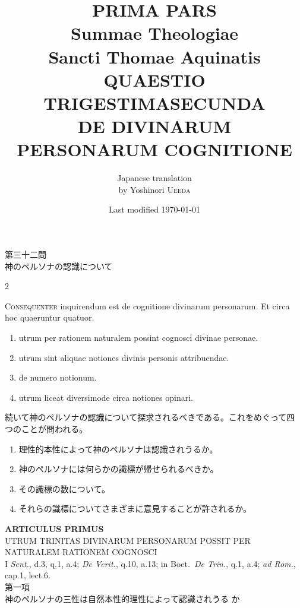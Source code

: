 \documentclass[paper=a4paper,fontsize=10pt,jafontsize=9pt,titlepage]{jlreq}
\title{{\bfseries PRIMA PARS}\\{\Huge Summae Theologiae}\\Sancti Thomae
Aquinatis\\{\sffamily QUAESTIO TRIGESTIMASECUNDA}\\DE DIVINARUM
PERSONARUM COGNITIONE}
\author{Japanese translation\\by Yoshinori {\scshape Ueeda}}
\date{Last modified \today}
\begin{document}
\maketitle

\begin{center}
{\Large 第三十二問\\神のペルソナの認識について}
\end{center}


\begin{paracol}{2}

{\Huge C}{\scshape onsequenter} inquirendum est de cognitione divinarum personarum. Et
 circa hoc quaeruntur quatuor. 

\begin{enumerate}
 \item utrum per rationem naturalem possint cognosci divinae personae. 
 \item utrum sint aliquae notiones divinis personis attribuendae.
 \item de numero notionum.
 \item utrum liceat diversimode circa notiones opinari.
\end{enumerate}

\switchcolumn

続いて神のペルソナの認識について探求されるべきである。これをめぐって四
 つのことが問われる。


\begin{enumerate}
 \item 理性的本性によって神のペルソナは認識されうるか。
 \item 神のペルソナには何らかの識標が帰せられるべきか。
 \item その識標の数について。
 \item それらの識標についてさまざまに意見することが許されるか。
\end{enumerate}

\end{paracol}



\newpage



\begin{center}
{\Large {\bfseries ARTICULUS PRIMUS}}\\
{\large UTRUM TRINITAS DIVINARUM PERSONARUM POSSIT PER NATURALEM
 RATIONEM COGNOSCI}\\
{\footnotesize I {\itshape Sent.}, d.3, q.1, a.4; {\itshape De
 Verit.}, q.10, a.13; in Boet.~{\itshape De Trin.}, q.1, a.4;
 {\itshape ad Rom.}, cap.1, lect.6.}\\
{\Large 第一項\\神のペルソナの三性は自然本性的理性によって認識されうる
 か}
\end{center}
\end{document}
